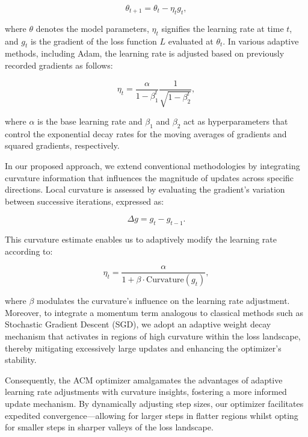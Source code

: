 \documentclass{article} %
\begin{document}
\begin{equation}
\theta_{t+1} = \theta_t - \eta_t g_t,
\end{equation}

where $\theta$ denotes the model parameters, $\eta_t$ signifies the learning rate at time $t$, and $g_t$ is the gradient of the loss function $L$ evaluated at $\theta_t$. In various adaptive methods, including Adam, the learning rate is adjusted based on previously recorded gradients as follows:

\begin{equation}
\eta_t = \frac{\alpha}{1 - \beta_1^{t}} \frac{1}{\sqrt{1 - \beta_2^{t}}},
\end{equation}

where $\alpha$ is the base learning rate and $\beta_1$ and $\beta_2$ act as hyperparameters that control the exponential decay rates for the moving averages of gradients and squared gradients, respectively.

In our proposed approach, we extend conventional methodologies by integrating curvature information that influences the magnitude of updates across specific directions. Local curvature is assessed by evaluating the gradient's variation between successive iterations, expressed as:

\begin{equation}
\Delta g = g_t - g_{t-1}.
\end{equation}

This curvature estimate enables us to adaptively modify the learning rate according to:

\begin{equation}
\eta_t = \frac{\alpha}{1 + \beta \cdot \text{Curvature}(g_t)},
\end{equation}

where $\beta$ modulates the curvature's influence on the learning rate adjustment. Moreover, to integrate a momentum term analogous to classical methods such as Stochastic Gradient Descent (SGD), we adopt an adaptive weight decay mechanism that activates in regions of high curvature within the loss landscape, thereby mitigating excessively large updates and enhancing the optimizer's stability.

Consequently, the ACM optimizer amalgamates the advantages of adaptive learning rate adjustments with curvature insights, fostering a more informed update mechanism. By dynamically adjusting step sizes, our optimizer facilitates expedited convergence—allowing for larger steps in flatter regions whilst opting for smaller steps in sharper valleys of the loss landscape.
\end{document}

